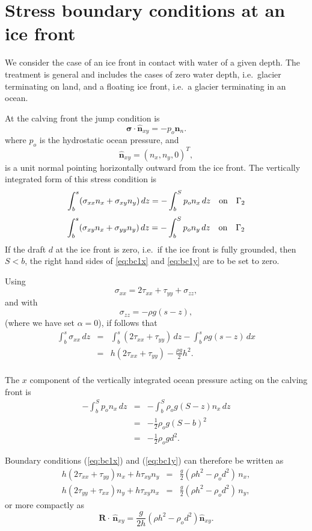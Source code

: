 \documentclass[10pt,a4paper]{book}
\newcommand{\txx}{\tau_{xx}}
\newcommand{\tyy}{\tau_{yy}}
\newcommand{\txy}{\tau_{xy}}
\newcommand{\sxx}{\sigma_{xx}}
\newcommand{\sxy}{\sigma_{xy}}
\newcommand{\syy}{\sigma_{yy}}
\newcommand{\szz}{\sigma_{zz}}
\newcommand{\normal}{\hat{\bm{n}}}
\begin{document}
\section{Stress boundary conditions at an ice front}

We consider the case of an ice front in contact with water of a given
depth. The treatment is general and includes the cases of zero water
depth, i.e.\ glacier terminating on land, and a floating ice front,
i.e.\ a glacier terminating in an ocean.


\label{sec:bccalving}
At the calving front the jump condition is
\[\bm{\sigma} \cdot \normal_{xy}= -p_o \normal_n .\]
where $p_o$ is the hydrostatic ocean pressure, and
\[
\normal_{xy}=(n_x,n_y,0)^T ,
\] 
is a unit normal pointing horizontally outward from the ice front.
The vertically integrated form of this stress condition is
\begin{equation}
 \int_b^s ( \sxx n_x + \sxy n_y) \, dz = -\int_b^S  p_o n_x \, dz  \quad \hbox{on} \quad \Gamma_2 
\label{eq:bc1x}
\end{equation}
\begin{equation} \int_b^s (\sxy n_x + \syy n_y) \, dz = -\int_b^S p_o n_y \, dz \quad \hbox{on} \quad \Gamma_2 
\label{eq:bc1y}
\end{equation}
If the draft $d$ at the ice front is zero,
i.e.\ if the ice front is fully grounded, then $S<b$, the right hand
sides of \eqref{eq:bc1x} and \eqref{eq:bc1y} are to be set to zero.

Using
\[ \sxx=2 \txx +\tyy + \szz ,\]
and with
\[ \szz=-\rho g (s-z) ,\]
(where we have set $\alpha=0$), if follows that
\begin{eqnarray*}
\int_b^s \sxx \, dz &=& \int_b^s (2 \txx + \tyy) \, dz - \int_b^s \rho g (s-z) \, dx \nonumber \\
                    &=& h (2 \txx + \tyy)  - \frac{\rho g}{2} h^2 . \nonumber \\
\end{eqnarray*}

The $x$ component of the vertically integrated ocean pressure acting on the calving front is
\begin{eqnarray*}
-\int_b^S  p_o n_x \, dz &=& -\int_b^S  \rho_o g (S-z) n_x \, dz \\
&=& -\frac{1}{2} \rho_o g (S-b)^2 \\
&=& -\frac{1}{2} \rho_o g d^2 .
\end{eqnarray*}

Boundary conditions (\ref{eq:bc1x}) and (\ref{eq:bc1y}) can therefore be written as
\begin{eqnarray}
h (2 \txx + \tyy) n_x + h \txy n_y &=&  \frac{g}{2} (\rho h^2 - \rho_o  d^2)\, n_x ,\label{eq:bcgfx} \\
h (2 \tyy + \txx) n_y + h \txy n_x &=&  \frac{g}{2} (\rho h^2 - \rho_o  d^2)\, n_y ,\label{eq:bcgfy}
\end{eqnarray}
or more compactly as
\begin{equation}
\bm{R} \cdot \, \normal_{xy}=\frac{g}{2h} ( \rho h^2-\rho_o d^2) \normal_{xy} .
\label{eq:BCCF}
\end{equation}
\end{document}
